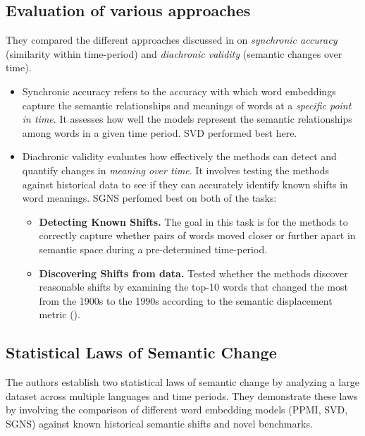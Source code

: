 \subsection{Evaluation of various approaches}
They compared the different approaches discussed in  on \emph{synchronic accuracy} (similarity within time-period) and \emph{diachronic validity} (semantic changes over time).
\begin{itemize}
    \item {}
    Synchronic accuracy refers to the accuracy with which word embeddings capture the semantic relationships and meanings of words at a \emph{specific point in time}.
    It assesses how well the models represent the semantic relationships among words in a given time period.
    SVD performed best here.
    \item {}
    Diachronic validity evaluates how effectively the methods can detect and quantify changes in \emph{meaning over time}.
    It involves testing the methods against historical data to see if they can accurately identify known shifts in word meanings.
    SGNS perfomed best on both of the tasks:
    \begin{itemize}
        \item \textbf{Detecting Known Shifts.}
        The goal in this task is for the methods to correctly capture whether pairs of words moved closer or further apart in semantic space during a pre-determined time-period.

        \item \textbf{Discovering Shifts from data.}
        Tested whether the methods discover reasonable shifts by examining the top-10 words that changed the most from the 1900s to the 1990s according to the semantic displacement metric ().
    \end{itemize}

\end{itemize}

\subsection{Statistical Laws of Semantic Change}
The authors establish two statistical laws of semantic change by analyzing a large dataset across multiple languages and time periods.
They demonstrate these laws by involving the comparison of different word embedding models (PPMI, SVD, SGNS) against known historical semantic shifts and novel benchmarks.

